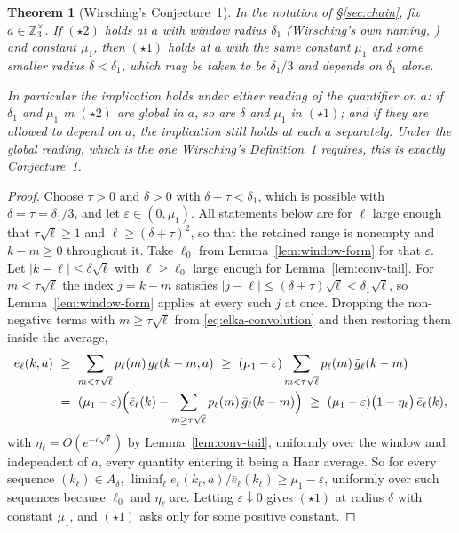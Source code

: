 \documentclass[11pt]{article}
\newtheorem{theorem}{Theorem}[section]
\theoremstyle{definition}
\theoremstyle{remark}
\begin{document}
\begin{theorem}[Wirsching's Conjecture~1]\label{thm:wirsching-conj1}
In the notation of \S\ref{sec:chain}, fix $a\in\mathbb Z_3^\times$. If
$(\star2)$ holds at $a$ with window radius $\delta_1$ (Wirsching's own
naming, \cite[\S2]{Wirsching2003}) and constant $\mu_1$, then
$(\star1)$ holds at $a$ with the same constant $\mu_1$ and some smaller
radius $\delta<\delta_1$, which may be taken to be $\delta_1/3$ and
depends on $\delta_1$ alone.

In particular the implication holds under either reading of the
quantifier on $a$: if $\delta_1$ and $\mu_1$ in $(\star2)$ are global in
$a$, so are $\delta$ and $\mu_1$ in $(\star1)$; and if they are allowed
to depend on $a$, the implication still holds at each $a$ separately.
Under the global reading, which is the one Wirsching's Definition~1
requires, this is exactly Conjecture~1.
\end{theorem}

\begin{proof}
Choose $\tau>0$ and $\delta>0$ with $\delta+\tau<\delta_1$, which is
possible with $\delta=\tau=\delta_1/3$, and let
$\varepsilon\in(0,\mu_1)$. All statements below are for $\ell$ large
enough that $\tau\sqrt\ell\ge1$ and $\ell\ge(\delta+\tau)^2$, so that
the retained range is nonempty and $k-m\ge0$ throughout it. Take $\ell_0$ from Lemma~\ref{lem:window-form} for
that $\varepsilon$. Let $|k-\ell|\le\delta\sqrt\ell$ with
$\ell\ge\ell_0$ large enough for Lemma~\ref{lem:conv-tail}. For
$m<\tau\sqrt\ell$ the index $j=k-m$ satisfies
$|j-\ell|\le(\delta+\tau)\sqrt\ell<\delta_1\sqrt\ell$, so
Lemma~\ref{lem:window-form} applies at every such $j$ at once. Dropping
the non-negative terms with $m\ge\tau\sqrt\ell$ from
\eqref{eq:elka-convolution} and then restoring them inside the average,
\[
\begin{aligned}
 e_\ell(k,a)
 &\ \ge\ \sum_{m<\tau\sqrt\ell}p_\ell(m)\,g_\ell(k-m,a)
 \ \ge\ (\mu_1-\varepsilon)\sum_{m<\tau\sqrt\ell}p_\ell(m)\,
        \bar g_\ell(k-m)\\
 &\ =\ (\mu_1-\varepsilon)\Bigl(\bar e_\ell(k)
       -\sum_{m\ge\tau\sqrt\ell}p_\ell(m)\,\bar g_\ell(k-m)\Bigr)
 \ \ge\ (\mu_1-\varepsilon)\bigl(1-\eta_\ell\bigr)\,\bar e_\ell(k),
\end{aligned}
\]
with $\eta_\ell=O(e^{-c\sqrt\ell})$ by Lemma~\ref{lem:conv-tail},
uniformly over the window and independent of $a$, every quantity
entering it being a Haar average. So for every sequence
$(k_\ell)\in A_\delta$,
$\liminf_\ell e_\ell(k_\ell,a)/\bar e_\ell(k_\ell)\ge\mu_1-\varepsilon$,
uniformly over such sequences because $\ell_0$ and $\eta_\ell$ are.
Letting $\varepsilon\downarrow0$ gives $(\star1)$ at radius $\delta$
with constant $\mu_1$, and $(\star1)$ asks only for some positive
constant.
\end{proof}
\end{document}
